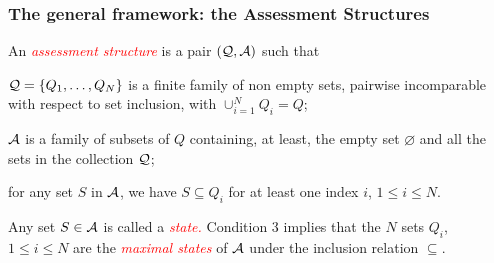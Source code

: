 \documentclass{beamer}
\def\es{\varnothing}
\def\SB{\subseteq}
\def\AAA{{\cal A}}
\def\QQQ{{\cal Q}}
\def\rtxt#1{\textcolor{red}{#1}}
\begin{document}
  \begin{frame}
  \frametitle{The general framework: the Assessment Structures}
   \center
\begin{minipage}{10cm}  \begin{definition} An \rtxt{\sl assessment structure} is a pair $(\QQQ,\AAA)$ such that 
  \begin{roster}
  \item $\QQQ=\{Q_1,\ldots,Q_N\}$ is a finite family of non empty  sets, pairwise incomparable with respect to set inclusion, with $\cup_{i=1}^N Q_i = Q$;
  \item  $\AAA$ is a family of subsets of $Q$ containing, at least,  the empty set $\es$ and all the sets in the collection $\QQQ$;
\item
for any set $S$ in $\AAA$, we have $S\SB Q_i$ for at least one  index $i$, $1\leq i\leq N$.
  \end{roster}
 Any set $S\in \AAA$ is called a \rtxt{\sl state.}  Condition 3 implies that the $N$ sets $Q_i$, $1\leq i\leq N$ are the \rtxt{\sl  maximal states} of $\AAA$ under the inclusion relation $\SB$. 
  \end{definition} 

\end{minipage}
\end{frame}
\end{document}
